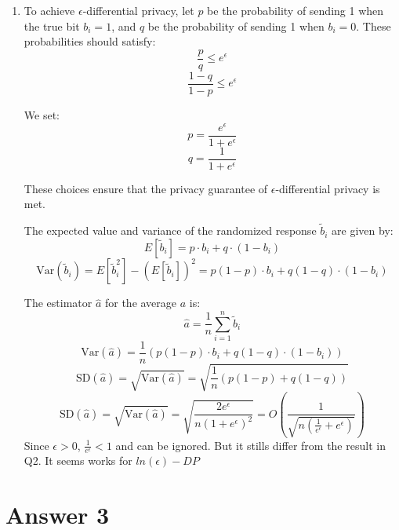 \documentclass[
	12pt, %
]{fphw}
\begin{document}
\begin{enumerate}
\item To achieve \( \epsilon \)-differential privacy, let \( p \) be the probability of sending 1 when the true bit \( b_i = 1 \), and \( q \) be the probability of sending 1 when \( b_i = 0 \). These probabilities should satisfy:
\[ \frac{p}{q} \leq e^\epsilon \]
\[ \frac{1-q}{1-p} \leq e^\epsilon \]

We set:
\[ p = \frac{e^\epsilon}{1 + e^\epsilon} \]
\[ q = \frac{1}{1 + e^\epsilon} \]

These choices ensure that the privacy guarantee of \( \epsilon \)-differential privacy is met.


The expected value and variance of the randomized response \( \tilde{b}_i \) are given by:
\[ E[\tilde{b}_i] = p \cdot b_i + q \cdot (1 - b_i) \]
\[ \text{Var}(\tilde{b}_i) = E[\tilde{b}_i^2] - (E[\tilde{b}_i])^2 = p(1-p) \cdot b_i + q(1-q) \cdot (1 - b_i) \]

The estimator \( \hat{a} \) for the average \( a \) is:
\[ \hat{a} = \frac{1}{n} \sum_{i=1}^n \tilde{b}_i \]
\[ \text{Var}(\hat{a}) = \frac{1}{n} (p(1-p) \cdot b_i + q(1-q) \cdot (1 - b_i)) \]
\[ \text{SD}(\hat{a}) = \sqrt{\text{Var}(\hat{a})} = \sqrt{\frac{1}{n} (p(1-p) + q(1-q))} \]
\[ \text{SD}(\hat{a}) = \sqrt{\text{Var}(\hat{a})} = \sqrt{\frac{2e^\epsilon}{n(1 + e^\epsilon)^2}}=O\left(\frac{1}{\sqrt{n(\frac{1}{e^\epsilon}+e^\epsilon)}}\right) \] 
Since $\epsilon >0$, $\frac{1}{e^\epsilon} < 1$ and can be ignored. But it stills differ from the result in Q2. It seems works for $ln(\epsilon)-DP$
\end{enumerate}

\section*{Answer 3}
\end{document}
